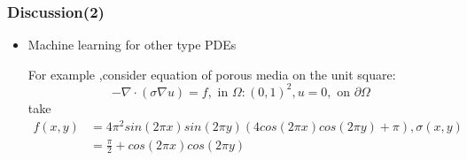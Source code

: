 \documentclass[mathserif,10pt]{beamer}
\begin{document}
\begin{frame}
\frametitle{Discussion(2)}

\begin{itemize}
    \item  Machine learning for other type PDEs


For example ,consider equation of porous media on the unit square:
\begin{equation*}
    -\nabla \cdot(\sigma \nabla u)=f ,\text{ in }\Omega :(0,1)^2, u=0 ,
    \text{ on } \partial \Omega
\end{equation*}
take 
\begin{align*}
f(x,y) 
&= 4\pi^2 sin(2\pi x) sin(2\pi y)(4 cos(2\pi x) cos(2\pi y) + \pi), \sigma(x,y) \\
&= \frac{\pi}{2} + cos(2\pi x) cos(2\pi y)
\end{align*}
\end{itemize}
\end{frame}
\end{document}
